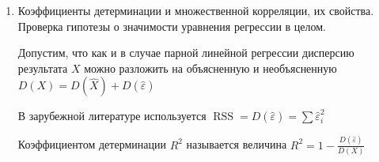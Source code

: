 \documentclass[12pt]{article}
\begin{document}
\begin{enumerate}
    $a_{ij} = \begin{pmatrix}Z_1^{(i)} & \dots & Z_n^{(i)}\end{pmatrix} \begin{pmatrix}Z_1^{(j)} \\ \vdots \\ Z_n^{(j)}\end{pmatrix} = 
    \begin{cases}
        n \overline{Z_i Z_j} = \gamma_i r_{Z_i, Z_j}, & \text{ при } i \neq j \\
        n \overline{Z_i^2} = n D Z_i = n, & \text{ при } i = j
    \end{cases}$

    Перевод коэффициентов можно выполнять по формулам:

    $b_i = \gamma_i \frac{\sigma_X}{\sigma_{Z_i}}; \quad \gamma_i = b \frac{\sigma_{Z_i}}{\sigma_X}$, $b_0 = \overline{x} - \sum_{i = 1}^n b_i \overline{z_i}$

    Значение $\gamma_i$ можно трактовать как величину прямого влияния $i$-ого фактора на результат. Остальные слагаемые в $i$-ом уравнении можно трактовать
    как величины косвенного влияния остальных факторов 

    $r_{Z_i Z_1} \gamma_1 + \dots + \gamma_i + \dots + r_{Z_i Z_k} \gamma_k = r_{Z_i, X}$

    Величину $r_{Z_i, X}$ можно рассматривать как сумму прямого и косвенного влияний

    \Nota Для измерения тесноты отдельной связи между отдельным фактором и результатом при очищении влиянии других факторов
    есть понятие коэффициента частной корреляции. При $k = 2$: $r_{X, Z_1 / Z_2} = \frac{r_{X, Z_1} - r_{X, Z_2} r_{Z_1, Z_2}}{\sqrt{(1 - r_{X, Z_2}^2)(1 - r_{Z_1, Z_2}^2)}}$

    \item Коэффициенты детерминации и множественной корреляции, их свойства. Проверка гипотезы о значимости уравнения регрессии в целом.

    Допустим, что как и в случае парной линейной регрессии дисперсию результата $X$ можно разложить на объясненную и необъясненную $D(X) = D(\hat X) + D(\hat \varepsilon)$

    \Nota В зарубежной литературе используется $\operatorname{RSS} = D(\hat \varepsilon) = \sum \hat \varepsilon_i^2$

    \Def Коэффициентом детерминации $R^2$ называется величина $R^2 = 1 - \frac{D(\hat \varepsilon)}{D(X)}$


\end{enumerate}
\end{document}
